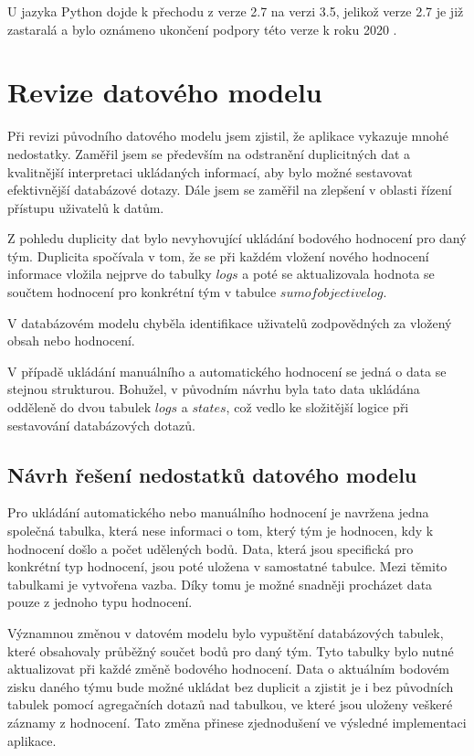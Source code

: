 \documentclass[
  digital, %
  twoside, %
  table,   %
  lof,     %
  lot,     %
]{fithesis3}
\begin{document}
U jazyka Python dojde k přechodu z verze 2.7 na verzi 3.5, jelikož verze 2.7 je již zastaralá a bylo oznámeno ukončení podpory této verze k roku 2020 \cite{python27}.


\section{Revize datového modelu}

Při revizi původního datového modelu jsem zjistil, že aplikace vykazuje mnohé nedostatky. Zaměřil jsem se především na odstranění duplicitných dat a kvalitnější interpretaci ukládaných informací, aby bylo možné sestavovat efektivnější databázové dotazy. Dále jsem se zaměřil na zlepšení v oblasti řízení přístupu uživatelů k datům.

Z pohledu duplicity dat bylo nevyhovující ukládání bodového hodnocení pro daný tým. Duplicita spočívala v tom, že se při každém vložení nového hodnocení informace vložila nejprve do tabulky $logs$ a poté se aktualizovala hodnota se součtem hodnocení pro konkrétní tým v tabulce $sumofobjectivelog$.

V databázovém modelu chyběla identifikace uživatelů zodpovědných za vložený obsah nebo hodnocení. 

V případě ukládání manuálního a automatického hodnocení se jedná o data se stejnou strukturou. Bohužel, v původním návrhu byla tato data ukládána odděleně do dvou tabulek $logs$ a $states$, což vedlo ke složitější logice při sestavování databázových dotazů.

\subsection{Návrh řešení nedostatků datového modelu}
Pro ukládání automatického nebo manuálního hodnocení je navržena jedna společná tabulka, která nese informaci o tom, který tým je hodnocen, kdy k hodnocení došlo a počet udělených bodů. Data, která jsou specifická pro konkrétní typ hodnocení, jsou poté uložena v samostatné tabulce. Mezi těmito tabulkami je vytvořena vazba. Díky tomu je možné snadněji procházet data pouze z jednoho typu hodnocení.

Významnou změnou v datovém modelu bylo vypuštění databázových tabulek, které obsahovaly průběžný součet bodů pro daný tým. Tyto tabulky bylo nutné aktualizovat při každé změně bodového hodnocení. Data o aktuálním bodovém zisku daného týmu bude možné ukládat bez duplicit a zjistit je i bez původních tabulek pomocí agregačních dotazů nad tabulkou, ve které jsou uloženy veškeré záznamy z hodnocení. Tato změna přinese zjednodušení ve výsledné implementaci aplikace.
\end{document}
